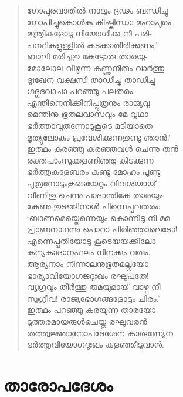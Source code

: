 \begin{verse}
ഗോപുരവാതില്‍ നാലും ദൃഢം ബന്ധിച്ചു\\
ഗോപിച്ചുകൊള്‍ക കിഷ്കിന്ധാ മഹാപുരം.\\
മന്ത്രികളോടു നിയോഗിക്ക നീ പരി-\\
പന്ഥികളുള്ളില്‍ കടക്കാതിരിക്കണം.’\\
ബാലി മരിച്ചതു കേട്ടോരു താരയു-\\
മോലോല വീഴുന്ന കണ്ണുനീരും വാര്‍ത്തു\\
ദുഃഖേന വക്ഷസി താഡിച്ചു താഡിച്ചു\\
ഗദ്ഗദവാചാ പറഞ്ഞു പലതരം:\\
എന്തിനെനിക്കിനിപ്പുത്രനും രാജ്യവു-\\
മെന്തിനു ഭൂതലവാസവും മേ വൃഥാ\\
ഭര്‍ത്താവുതന്നോടുകൂടെ മടിയാതെ\\
മൃത്യുലോകം പ്രവേശിക്കുന്നതുണ്ടു ഞാന്‍.’\\
ഇത്ഥം കരഞ്ഞു കരഞ്ഞവള്‍ ചെന്നു തന്‍\\
രക്തപാംസുക്കളണിഞ്ഞു കിടക്കുന്ന\\
ഭര്‍ത്തൃകളേബരം കണ്ടു മോഹം പൂണ്ടു\\
പുത്രനോടുംകൂടെയേറ്റം വിവശയായ്\\
വീണിതു ചെന്നു പാദാന്തികേ താരയും\\
കേണു തുടങ്ങിനാള്‍ പിന്നെപ്പലതരം:\\
‘ബാണമെയ്തെന്നെയും കൊന്നീടു നീ മമ\\
പ്രാണനാഥന്നു പൊറാ പിരിഞ്ഞാലെടോ!\\
എന്നെപ്പതിയോടു കൂടെയയക്കിലോ\\
കന്യകാദാനഫലം നിനക്കും വരും.\\
ആര്യനാം നിന്നാലനുഭൂതമല്ലയോ\\
ഭാര്യാവിയോഗജദുഃഖം രഘുപതേ!\\
വ്യഗ്രവും തീര്‍ത്തു രുമയുമായ് വാഴ്ക നീ\\
സുഗ്രീവ! രാജ്യഭോഗങ്ങളോടും ചിരം.’\\
ഇത്ഥം പറഞ്ഞു കരയുന്ന താരയോ-\\
ടുത്തരമായരുള്‍ചെയ്തു രഘുവരന്‍\\
തത്ത്വജ്ഞാനോപദേശേന കാരുണ്യേന\\
ഭര്‍ത്തൃവിയോഗദുഃഖം കളഞ്ഞീടുവാന്‍.
\end{verse}


\section{താരോപദേശം}

